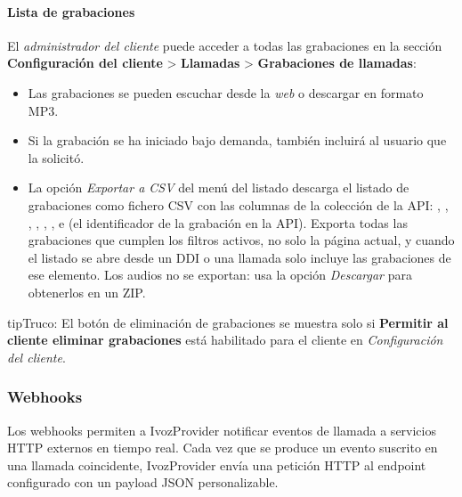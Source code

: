 \documentclass[letterpaper,10pt,spanish]{sphinxmanual}
\begin{document}
\paragraph{Lista de grabaciones}
\label{administration_portal/client/vpbx/calls/call_recordings:recordings-list}
El \emph{administrador del cliente} puede acceder a todas las grabaciones en la sección \textbf{Configuración del cliente} \textgreater{} \textbf{Llamadas} \textgreater{} \textbf{Grabaciones de llamadas}:
\begin{itemize}
\item {} 
Las grabaciones se pueden escuchar desde la \emph{web} o descargar en formato MP3.

\item {} 
Si la grabación se ha iniciado bajo demanda, también incluirá al usuario que la solicitó.

\item {} 
La opción \emph{Exportar a CSV} del menú del listado descarga el listado de grabaciones como fichero CSV con las columnas de la colección de la API: , , , , , ,  e  (el identificador de la grabación en la API). Exporta todas las grabaciones que cumplen los filtros activos, no solo la página actual, y cuando el listado se abre desde un DDI o una llamada solo incluye las grabaciones de ese elemento. Los audios no se exportan: usa la opción \emph{Descargar} para obtenerlos en un ZIP.

\end{itemize}

\begin{notice}{tip}{Truco:}
El botón de eliminación de grabaciones se muestra solo si \textbf{Permitir al cliente eliminar grabaciones} está habilitado para el cliente en \emph{Configuración del cliente}.
\end{notice}


\subsubsection{Webhooks}
\label{administration_portal/client/vpbx/calls/webhooks:vpbx-webhooks}\label{administration_portal/client/vpbx/calls/webhooks::doc}\label{administration_portal/client/vpbx/calls/webhooks:webhooks}
Los webhooks permiten a IvozProvider notificar eventos de llamada a servicios HTTP externos en tiempo real. Cada vez que se produce un evento suscrito en una llamada coincidente, IvozProvider envía una petición HTTP  al endpoint configurado con un payload JSON personalizable.
\end{document}
